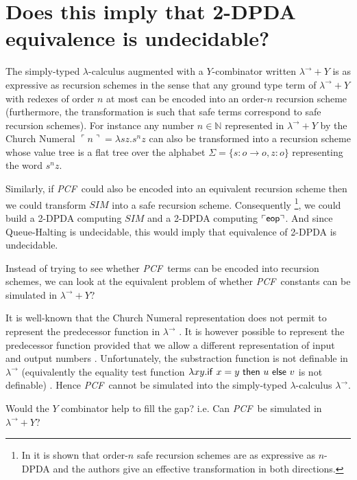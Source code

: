 \documentclass{article}
\newcommand{\encode}[1]{\ulcorner #1 \urcorner}
\newcommand{\nat}{\mathbb{N}}
\newcommand\eop{{\sf eop}}
\newcommand\pcf{\textsl{PCF}}
\begin{document}
\section{Does this imply that 2-DPDA equivalence is undecidable?}

The simply-typed $\lambda$-calculus augmented with a $Y$-combinator written $\lambda^\rightarrow + Y$ is as expressive as recursion schemes in the sense that any ground type term of $\lambda^\rightarrow + Y$ with redexes of order $n$ at most can be encoded into an order-$n$ recursion scheme (furthermore, the transformation is such that safe terms correspond to safe recursion schemes).
For instance any number $n \in \nat$ represented in $\lambda^\rightarrow + Y$ by the Church Numeral $\encode{n} = \lambda s z. s^n z$ can also be transformed into a recursion scheme whose value tree is a flat tree over the alphabet $\Sigma = \{s:o\rightarrow o, z:o\}$ representing the word $s^n z$. 


Similarly, if \pcf\ could also be encoded into an equivalent recursion scheme then we could transform $SIM$ into a safe recursion scheme. Consequently \footnote{In \cite{KNU02} it is shown that order-$n$ safe recursion schemes are as expressive as $n$-DPDA and the authors give an effective transformation in both directions.}, we could build a 2-DPDA computing $SIM$ and a 2-DPDA computing $\encode{\eop}$. And since Queue-Halting is undecidable, this would imply that equivalence of 2-DPDA is undecidable.

Instead of trying to see whether \pcf\ terms can be encoded into recursion schemes, we can look at the equivalent problem of whether \pcf\ constants can be simulated in $\lambda^\rightarrow + Y$?

It is well-known that the Church Numeral representation does not permit
to represent the predecessor function in $\lambda^\rightarrow$ \cite{DBLP:journals/jacm/FortuneLO83}. It is however possible to represent the predecessor function provided that we allow a different representation of input and output numbers \cite{DBLP:journals/jacm/FortuneLO83}.
Unfortunately, the substraction function is not definable in $\lambda^\rightarrow$ (equivalently  the equality test function $\lambda xy. {\sf if\ } x = y {\sf\ then\ } u {\sf\ else\ } v$ is not definable) \cite{DBLP:journals/jacm/FortuneLO83}.
Hence \pcf\ cannot be simulated into the simply-typed $\lambda$-calculus $\lambda^\rightarrow$.

Would the $Y$ combinator help to fill the gap? i.e. Can \pcf\ be simulated in  $\lambda^\rightarrow + Y$?  
\end{document}
